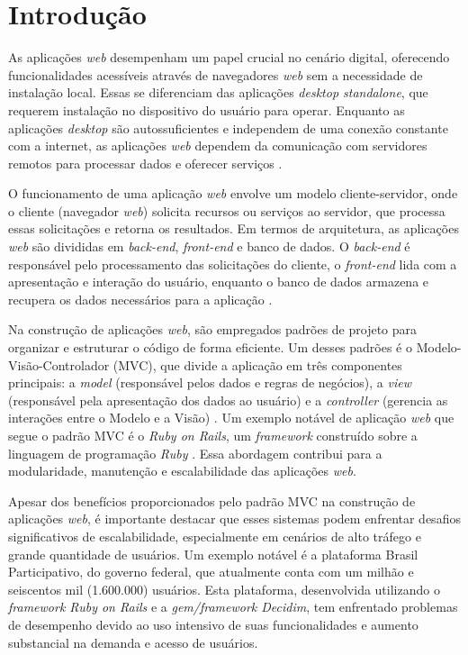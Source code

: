 \chapter{Introdução}

As aplicações \textit{web} desempenham um papel crucial no cenário digital, oferecendo funcionalidades acessíveis através de navegadores \textit{web} sem a necessidade de instalação local. Essas se diferenciam das aplicações \textit{desktop standalone}, que requerem instalação no dispositivo do usuário para operar. Enquanto as aplicações \textit{desktop} são autossuficientes e independem de uma conexão constante com a internet, as aplicações \textit{web} dependem da comunicação com servidores remotos para processar dados e oferecer serviços \cite{tanenbaum1978guidelines}.

O funcionamento de uma aplicação \textit{web} envolve um modelo cliente-servidor, onde o cliente (navegador \textit{web}) solicita recursos ou serviços ao servidor, que processa essas solicitações e retorna os resultados. Em termos de arquitetura, as aplicações \textit{web} são divididas em \textit{back-end}, \textit{front-end} e banco de dados. O \textit{back-end} é responsável pelo processamento das solicitações do cliente, o \textit{front-end} lida com a apresentação e interação do usuário, enquanto o banco de dados armazena e recupera os dados necessários para a aplicação \cite{gough2021mastering}.

Na construção de aplicações \textit{web}, são empregados padrões de projeto para organizar e estruturar o código de forma eficiente. Um desses padrões é o Modelo-Visão-Controlador (MVC), que divide a aplicação em três componentes principais: a \textit{model} (responsável pelos dados e regras de negócios), a \textit{view} (responsável pela apresentação dos dados ao usuário) e a \textit{controller} (gerencia as interações entre o Modelo e a Visão) \cite{Bucanek2009}. Um exemplo notável de aplicação \textit{web} que segue o padrão MVC é o \textit{Ruby on Rails}, um \textit{framework} construído sobre a linguagem de programação \textit{Ruby} \cite{railsapi2023}. Essa abordagem contribui para a modularidade, manutenção e escalabilidade das aplicações \textit{web}.

Apesar dos benefícios proporcionados pelo padrão MVC na construção de aplicações \textit{web}, é importante destacar que esses sistemas podem enfrentar desafios significativos de escalabilidade, especialmente em cenários de alto tráfego e grande quantidade de usuários. Um exemplo notável é a plataforma Brasil Participativo, do governo federal, que atualmente conta com um milhão e seiscentos mil (1.600.000) usuários. Esta plataforma, desenvolvida utilizando o \textit{framework Ruby on Rails} e a \textit{gem/framework Decidim}, tem enfrentado problemas de desempenho devido ao uso intensivo de suas funcionalidades e aumento substancial na demanda e acesso de usuários.

